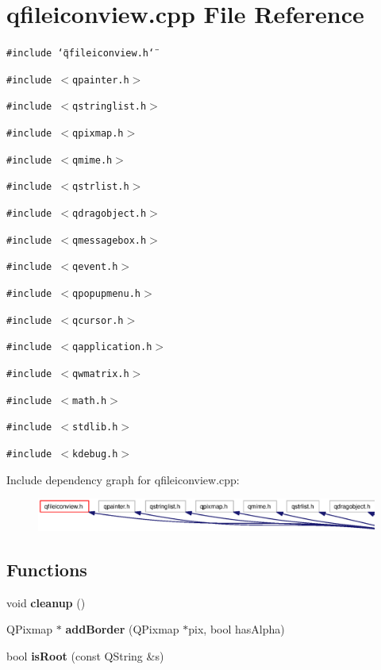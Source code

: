 \section{qfileiconview.cpp File Reference}
\label{qfileiconview_8cpp}


{\tt \#include \char`\"{}qfileiconview.h\char`\"{}}\par
{\tt \#include $<$qpainter.h$>$}\par
{\tt \#include $<$qstringlist.h$>$}\par
{\tt \#include $<$qpixmap.h$>$}\par
{\tt \#include $<$qmime.h$>$}\par
{\tt \#include $<$qstrlist.h$>$}\par
{\tt \#include $<$qdragobject.h$>$}\par
{\tt \#include $<$qmessagebox.h$>$}\par
{\tt \#include $<$qevent.h$>$}\par
{\tt \#include $<$qpopupmenu.h$>$}\par
{\tt \#include $<$qcursor.h$>$}\par
{\tt \#include $<$qapplication.h$>$}\par
{\tt \#include $<$qwmatrix.h$>$}\par
{\tt \#include $<$math.h$>$}\par
{\tt \#include $<$stdlib.h$>$}\par
{\tt \#include $<$kdebug.h$>$}\par


Include dependency graph for qfileiconview.cpp:\begin{figure}[H]
\begin{center}
\leavevmode
\includegraphics[width=420pt]{qfileiconview_8cpp__incl}
\end{center}
\end{figure}
\subsection*{Functions}
\begin{CompactItemize}
\item 
void {\bf cleanup} ()
\item 
QPixmap $\ast$ {\bf add\-Border} (QPixmap $\ast$pix, bool has\-Alpha)
\item 
bool {\bf is\-Root} (const QString \&s)
\end{CompactItemize}

